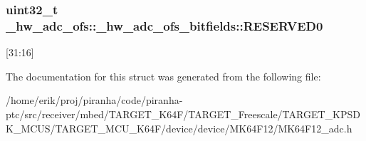 \subsubsection[{\texorpdfstring{R\+E\+S\+E\+R\+V\+E\+D0}{RESERVED0}}]{\setlength{\rightskip}{0pt plus 5cm}uint32\+\_\+t \+\_\+hw\+\_\+adc\+\_\+ofs\+::\+\_\+hw\+\_\+adc\+\_\+ofs\+\_\+bitfields\+::\+R\+E\+S\+E\+R\+V\+E\+D0}\hypertarget{struct__hw__adc__ofs_1_1__hw__adc__ofs__bitfields_a848c44c4c6a0a74a8a58510e316b0282}{}\label{struct__hw__adc__ofs_1_1__hw__adc__ofs__bitfields_a848c44c4c6a0a74a8a58510e316b0282}
\mbox{[}31\+:16\mbox{]} 

The documentation for this struct was generated from the following file\+:\begin{DoxyCompactItemize}
\item 
/home/erik/proj/piranha/code/piranha-\/ptc/src/receiver/mbed/\+T\+A\+R\+G\+E\+T\+\_\+\+K64\+F/\+T\+A\+R\+G\+E\+T\+\_\+\+Freescale/\+T\+A\+R\+G\+E\+T\+\_\+\+K\+P\+S\+D\+K\+\_\+\+M\+C\+U\+S/\+T\+A\+R\+G\+E\+T\+\_\+\+M\+C\+U\+\_\+\+K64\+F/device/device/\+M\+K64\+F12/M\+K64\+F12\+\_\+adc.\+h\end{DoxyCompactItemize}
